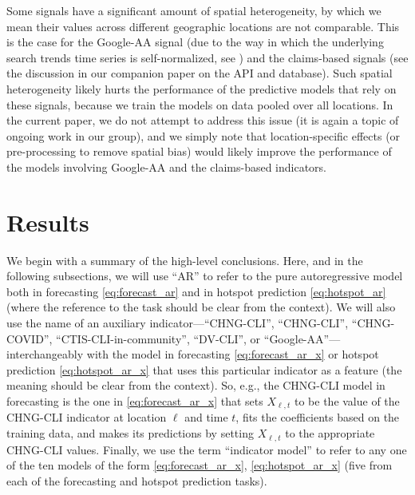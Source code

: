 \documentclass[9pt,twocolumn,twoside,lineno]{pnas-new}
\begin{document}
Some signals have a significant amount of spatial heterogeneity, by which we
mean their values across different geographic locations are not comparable.
This is the case for the Google-AA signal (due to the way in which the
underlying search trends time series is self-normalized, see
\cite{GoogleSymptoms}) and the claims-based signals (see the discussion in our
companion paper on the API and database).  Such spatial heterogeneity likely
hurts the performance of the predictive models that rely on these signals,
because we train the models on data pooled over all locations.  In the current
paper, we do not attempt to address this issue (it is again a topic of ongoing
work in our group), and we simply note that location-specific effects (or
pre-processing to remove spatial bias) would likely improve the performance of
the models involving Google-AA and the claims-based indicators.

\section{Results}

We begin with a summary of the high-level conclusions.  Here, and in the
following subsections, we will use ``AR'' to refer to the pure autoregressive
model both in forecasting \eqref{eq:forecast_ar} and in hotspot prediction
\eqref{eq:hotspot_ar} (where the reference to the task should be clear from the
context). We will also use the name of an auxiliary indicator---``CHNG-CLI'', 
``CHNG-CLI'', ``CHNG-COVID'', ``CTIS-CLI-in-community'', ``DV-CLI'', or
``Google-AA''---interchangeably with the model in forecasting
\eqref{eq:forecast_ar_x} or hotspot prediction \eqref{eq:hotspot_ar_x} that uses
this particular indicator as a feature (the meaning should be clear from the
context).  So, e.g., the CHNG-CLI model in forecasting is the one in
\eqref{eq:forecast_ar_x} that sets $X_{\ell,t}$ to be the value of the CHNG-CLI
indicator at location $\ell$ and time $t$, fits the coefficients based on the
training data, and makes its predictions by setting $X_{\ell,t}$ to the
appropriate CHNG-CLI values.  Finally, we use the term ``indicator model'' to 
refer to any one of the ten models of the form \eqref{eq:forecast_ar_x},
\eqref{eq:hotspot_ar_x} (five from each of the forecasting and hotspot
prediction tasks).
\end{document}

